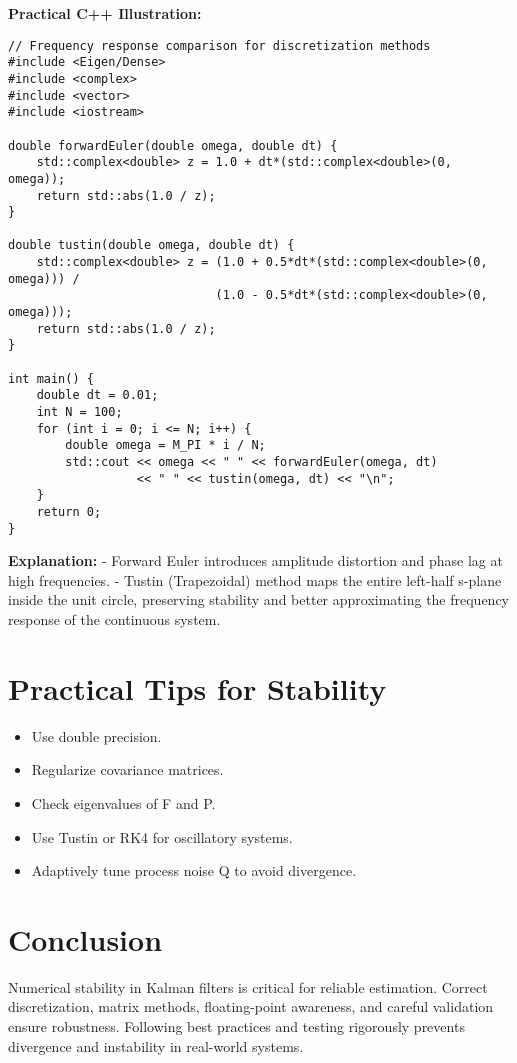 \documentclass[11pt]{article}
\begin{document}
\textbf{Practical C++ Illustration:}

\begin{lstlisting}
// Frequency response comparison for discretization methods
#include <Eigen/Dense>
#include <complex>
#include <vector>
#include <iostream>

double forwardEuler(double omega, double dt) {
    std::complex<double> z = 1.0 + dt*(std::complex<double>(0, omega));
    return std::abs(1.0 / z);
}

double tustin(double omega, double dt) {
    std::complex<double> z = (1.0 + 0.5*dt*(std::complex<double>(0, omega))) /
                             (1.0 - 0.5*dt*(std::complex<double>(0, omega)));
    return std::abs(1.0 / z);
}

int main() {
    double dt = 0.01;
    int N = 100;
    for (int i = 0; i <= N; i++) {
        double omega = M_PI * i / N;
        std::cout << omega << " " << forwardEuler(omega, dt)
                  << " " << tustin(omega, dt) << "\n";
    }
    return 0;
}
\end{lstlisting}

\textbf{Explanation:}  
- Forward Euler introduces amplitude distortion and phase lag at high frequencies.  
- Tustin (Trapezoidal) method maps the entire left-half s-plane inside the unit circle, preserving stability and better approximating the frequency response of the continuous system.  

\section{Practical Tips for Stability}
\begin{itemize}
    \item Use double precision.
    \item Regularize covariance matrices.
    \item Check eigenvalues of F and P.
    \item Use Tustin or RK4 for oscillatory systems.
    \item Adaptively tune process noise Q to avoid divergence.
\end{itemize}

\section{Conclusion}
Numerical stability in Kalman filters is critical for reliable estimation. Correct discretization, matrix methods, floating-point awareness, and careful validation ensure robustness. Following best practices and testing rigorously prevents divergence and instability in real-world systems.
\end{document}
